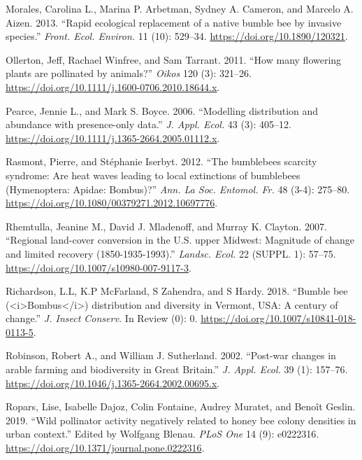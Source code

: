 \documentclass[11pt,]{article}
\begin{document}
\leavevmode\hypertarget{ref-Morales2013}{}%
Morales, Carolina L., Marina P. Arbetman, Sydney A. Cameron, and Marcelo
A. Aizen. 2013. ``Rapid ecological replacement of a native bumble bee by
invasive species.'' \emph{Front. Ecol. Environ.} 11 (10): 529--34.
\url{https://doi.org/10.1890/120321}.

\leavevmode\hypertarget{ref-Ollerton2011}{}%
Ollerton, Jeff, Rachael Winfree, and Sam Tarrant. 2011. ``How many
flowering plants are pollinated by animals?'' \emph{Oikos} 120 (3):
321--26. \url{https://doi.org/10.1111/j.1600-0706.2010.18644.x}.

\leavevmode\hypertarget{ref-Pearce2006}{}%
Pearce, Jennie L., and Mark S. Boyce. 2006. ``Modelling distribution and
abundance with presence-only data.'' \emph{J. Appl. Ecol.} 43 (3):
405--12. \url{https://doi.org/10.1111/j.1365-2664.2005.01112.x}.

\leavevmode\hypertarget{ref-Rasmont2012}{}%
Rasmont, Pierre, and Stéphanie Iserbyt. 2012. ``The bumblebees scarcity
syndrome: Are heat waves leading to local extinctions of bumblebees
(Hymenoptera: Apidae: Bombus)?'' \emph{Ann. La Soc. Entomol. Fr.} 48
(3-4): 275--80. \url{https://doi.org/10.1080/00379271.2012.10697776}.

\leavevmode\hypertarget{ref-Rhemtulla2007a}{}%
Rhemtulla, Jeanine M., David J. Mladenoff, and Murray K. Clayton. 2007.
``Regional land-cover conversion in the U.S. upper Midwest: Magnitude of
change and limited recovery (1850-1935-1993).'' \emph{Landsc. Ecol.} 22
(SUPPL. 1): 57--75. \url{https://doi.org/10.1007/s10980-007-9117-3}.

\leavevmode\hypertarget{ref-Richardson2018}{}%
Richardson, L.L, K.P McFarland, S Zahendra, and S Hardy. 2018. ``Bumble
bee (\textless{}i\textgreater{}Bombus\textless{}/i\textgreater{})
distribution and diversity in Vermont, USA: A century of change.''
\emph{J. Insect Conserv.} In Review (0): 0.
\url{https://doi.org/10.1007/s10841-018-0113-5}.

\leavevmode\hypertarget{ref-Robinson2002}{}%
Robinson, Robert A., and William J. Sutherland. 2002. ``Post-war changes
in arable farming and biodiversity in Great Britain.'' \emph{J. Appl.
Ecol.} 39 (1): 157--76.
\url{https://doi.org/10.1046/j.1365-2664.2002.00695.x}.

\leavevmode\hypertarget{ref-Ropars2019}{}%
Ropars, Lise, Isabelle Dajoz, Colin Fontaine, Audrey Muratet, and Benoît
Geslin. 2019. ``Wild pollinator activity negatively related to honey bee
colony densities in urban context.'' Edited by Wolfgang Blenau.
\emph{PLoS One} 14 (9): e0222316.
\url{https://doi.org/10.1371/journal.pone.0222316}.
\end{document}

